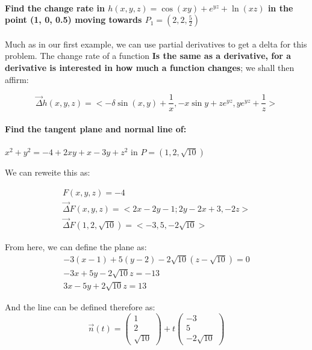 \documentclass[11pt,fleqn]{book} %
\begin{document}
\paragraph*{Find the change rate in $h(x,y,z) = \cos(xy)+e^{yz}+\ln(xz)$ in the point
(1, 0, 0.5) moving towards $P_1 = (2,2,\frac{5}{2})$} 

Much as in our first example, we can use partial derivatives to get a delta for this problem.
The change rate of a function \textbf{Is the same as a derivative, for a derivative is interested in
how much a function changes}; we shall then affirm:

\begin{equation}
    \vec{\Delta}h(x,y,z) = <-\delta \sin(x,y) + \frac{1}{x}, - x \sin y +ze^{yz}, ye^{yz} + \frac{1}{z} >
\end{equation}

\paragraph*{Find the tangent plane and normal line of:}
$x^2 + y^2 = -4+2xy + x - 3y + z^2$ in $P=(1,2,\sqrt{10})$

We can reweite this as: 

\begin{gather}
    F(x,y,z) = -4 \\
    \vec{\Delta} F (x,y,z) = <2x-2y-1; 2y - 2x + 3, -2z > \\
    \vec{\Delta} F(1,2,\sqrt{10}) = <-3,5,-2 \sqrt{10}>
\end{gather}

From here, we can define the plane as:
\begin{gather}
    -3(x-1) + 5(y-2) - 2 \sqrt{10}(z-\sqrt{10}) = 0 \\
    -3x + 5y - 2\sqrt{10} z = -13 \\
    3x - 5y + 2\sqrt{10} z = 13
\end{gather}

And the line can be defined therefore as:
\begin{equation}
    \vec{n}(t) = \begin{pmatrix}
        1 \\
        2\\
        \sqrt{10}
    \end{pmatrix} + t \begin{pmatrix}
        -3 \\
        5 \\
        -2 \sqrt{10}
    \end{pmatrix}
\end{equation}
\end{document}
